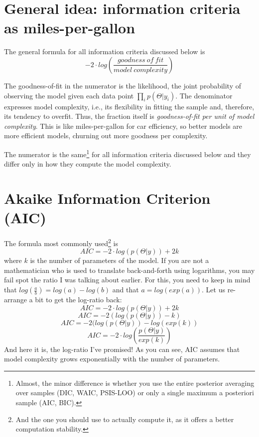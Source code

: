 \documentclass[
]{book}
\begin{document}
\hypertarget{general-idea-information-criteria-as-miles-per-gallon}{%
\section{General idea: information criteria as miles-per-gallon}\label{general-idea-information-criteria-as-miles-per-gallon}}

The general formula for all information criteria discussed below is
\[-2\cdot log \left( \frac{goodness~of~fit}{model~complexity} \right)\]

The goodness-of-fit in the numerator is the likelihood, the joint probability of observing the model given each data point \(\prod_i p(\Theta|y_i)\). The denominator expresses model complexity, i.e., its flexibility in fitting the sample and, therefore, its tendency to overfit. Thus, the fraction itself is \emph{goodness-of-fit per unit of model complexity}. This is like miles-per-gallon for car efficiency, so better models are more efficient models, churning out more goodness per complexity.

The numerator is the same\footnote{Almost, the minor difference is whether you use the entire posterior averaging over samples (DIC, WAIC, PSIS-LOO) or only a single maximum a posteriori sample (AIC, BIC).} for all information criteria discussed below and they differ only in how they compute the model complexity.

\hypertarget{akaike-information-criterion-aic}{%
\section{Akaike Information Criterion (AIC)}\label{akaike-information-criterion-aic}}

The formula most commonly used\footnote{And the one you should use to actually compute it, as it offers a better computation stability.} is
\[ AIC = -2\cdot log(p(\Theta|y)) + 2k \]
where \(k\) is the number of parameters of the model. If you are not a mathematician who is used to translate back-and-forth using logarithms, you may fail spot the ratio I was talking about earlier. For this, you need to keep in mind that \(log(\frac{a}{b}) = log(a) - log(b)\) and that \(a = log(exp(a))\). Let us re-arrange a bit to get the log-ratio back:
\[ AIC = -2\cdot log(p(\Theta|y)) + 2k \]
\[ AIC = -2 (log(p(\Theta|y)) - k)\]
\[ AIC = -2 (log(p(\Theta|y)) - log(exp(k))\]
\[ AIC = -2 \cdot log \left(\frac{p(\Theta|y)}{exp(k)} \right)\]
And here it is, the log-ratio I've promised! As you can see, AIC assumes that model complexity grows exponentially with the number of parameters.
\end{document}

